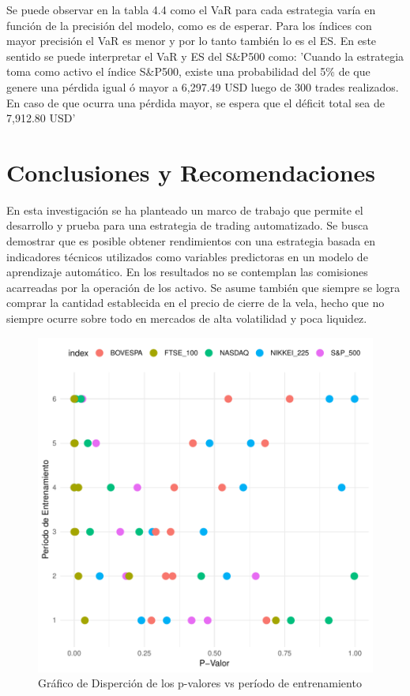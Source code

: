 \documentclass[a4paper,12pt]{Latex/Classes/PhDthesisPSnPDF}
\begin{document}
Se puede observar en la tabla 4.4 como el VaR para cada estrategia varía en función de la precisión del modelo, como es de esperar. Para los índices con mayor precisión el VaR es menor y por lo tanto también lo es el ES. En este sentido se puede interpretar el VaR y ES del S\&P500 como: 'Cuando la estrategia toma como activo el índice S\&P500, existe una probabilidad del 5\% de que genere una pérdida igual ó mayor a 6,297.49 USD luego de 300 trades realizados. En caso de que ocurra una pérdida mayor, se espera que el déficit total sea de 7,912.80 USD'

\chapter*{Conclusiones y Recomendaciones}

En esta investigación se ha planteado un marco de trabajo que permite el desarrollo y prueba para una estrategia de trading automatizado. Se busca demostrar que es posible obtener rendimientos con una estrategia basada en indicadores técnicos utilizados como variables predictoras en un modelo de aprendizaje automático. En los resultados no se contemplan las comisiones acarreadas por la operación de los activo. Se asume también que siempre se logra comprar la cantidad establecida en el precio de cierre de la vela, hecho que no siempre ocurre sobre todo en mercados de alta volatilidad y poca liquidez.


\begin{figure}[H]
\centering
\includegraphics{main-039}
\caption{Gráfico de Disperción de los p-valores vs período de entrenamiento}
\end{figure}
\end{document}
